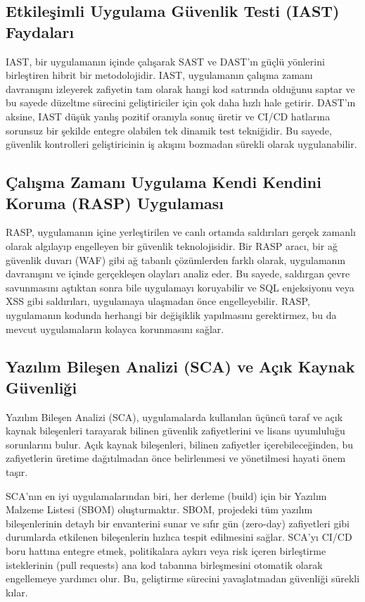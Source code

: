 \subsection{Etkileşimli Uygulama Güvenlik Testi (IAST) Faydaları}

IAST, bir uygulamanın içinde çalışarak SAST ve DAST'ın güçlü yönlerini birleştiren hibrit bir metodolojidir. IAST, uygulamanın çalışma zamanı davranışını izleyerek zafiyetin tam olarak hangi kod satırında olduğunu saptar ve bu sayede düzeltme sürecini geliştiriciler için çok daha hızlı hale getirir. DAST'ın aksine, IAST düşük yanlış pozitif oranıyla sonuç üretir ve CI/CD hatlarına sorunsuz bir şekilde entegre olabilen tek dinamik test tekniğidir. Bu sayede, güvenlik kontrolleri geliştiricinin iş akışını bozmadan sürekli olarak uygulanabilir.

\subsection{Çalışma Zamanı Uygulama Kendi Kendini Koruma (RASP) Uygulaması}

RASP, uygulamanın içine yerleştirilen ve canlı ortamda saldırıları gerçek zamanlı olarak algılayıp engelleyen bir güvenlik teknolojisidir. Bir RASP aracı, bir ağ güvenlik duvarı (WAF) gibi ağ tabanlı çözümlerden farklı olarak, uygulamanın davranışını ve içinde gerçekleşen olayları analiz eder. Bu sayede, saldırgan çevre savunmasını aştıktan sonra bile uygulamayı koruyabilir ve SQL enjeksiyonu veya XSS gibi saldırıları, uygulamaya ulaşmadan önce engelleyebilir. RASP, uygulamanın kodunda herhangi bir değişiklik yapılmasını gerektirmez, bu da mevcut uygulamaların kolayca korunmasını sağlar.

\subsection{Yazılım Bileşen Analizi (SCA) ve Açık Kaynak Güvenliği}

Yazılım Bileşen Analizi (SCA), uygulamalarda kullanılan üçüncü taraf ve açık kaynak bileşenleri tarayarak bilinen güvenlik zafiyetlerini ve lisans uyumluluğu sorunlarını bulur. Açık kaynak bileşenleri, bilinen zafiyetler içerebileceğinden, bu zafiyetlerin üretime dağıtılmadan önce belirlenmesi ve yönetilmesi hayati önem taşır.

SCA'nın en iyi uygulamalarından biri, her derleme (build) için bir Yazılım Malzeme Listesi (SBOM) oluşturmaktır. SBOM, projedeki tüm yazılım bileşenlerinin detaylı bir envanterini sunar ve sıfır gün (zero-day) zafiyetleri gibi durumlarda etkilenen bileşenlerin hızlıca tespit edilmesini sağlar. SCA'yı CI/CD boru hattına entegre etmek, politikalara aykırı veya risk içeren birleştirme isteklerinin (pull requests) ana kod tabanına birleşmesini otomatik olarak engellemeye yardımcı olur. Bu, geliştirme sürecini yavaşlatmadan güvenliği sürekli kılar.

